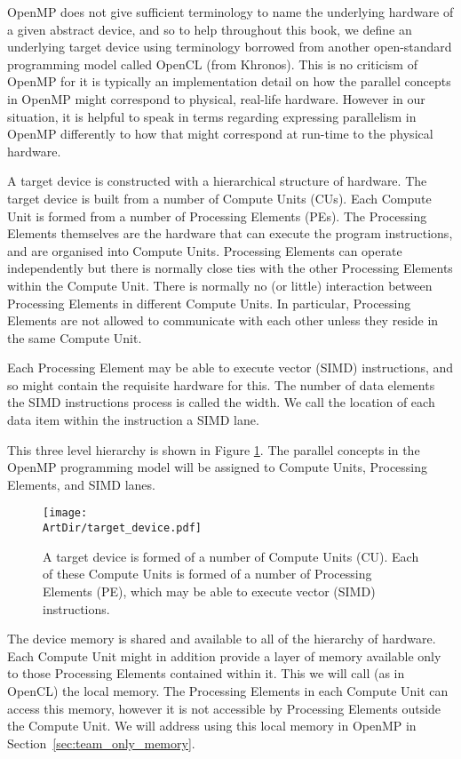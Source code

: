OpenMP does not give sufficient terminology to name the underlying hardware of a given abstract device, and so to help throughout this book, we define an underlying target device using terminology borrowed from another open-standard programming model called OpenCL (from Khronos).
This is no criticism of OpenMP for it is typically an implementation detail on how the parallel concepts in OpenMP might correspond to physical, real-life hardware.
However in our situation, it is helpful to speak in terms regarding expressing parallelism in OpenMP differently to how that might correspond at run-time to the physical hardware.

A target device is constructed with a hierarchical structure of hardware.
The target device is built from a number of Compute Units (CUs).
Each Compute Unit is formed from a number of Processing Elements (PEs).
The Processing Elements themselves are the hardware that can execute the program instructions, and are organised into Compute Units.
Processing Elements can operate independently but there is normally close ties with the other Processing Elements within the Compute Unit.
There is normally no (or little) interaction between Processing Elements in different Compute Units.
In particular, Processing Elements are not allowed to communicate with each other unless they reside in the same Compute Unit.

Each Processing Element may be able to execute vector (SIMD) instructions, and so might contain the requisite hardware for this.
The number of data elements the SIMD instructions process is called the width.
We call the location of each data item within the instruction a SIMD lane.

This three level hierarchy is shown in Figure \ref{figure:target_device_hierarchy}.
The parallel concepts in the OpenMP programming model will be assigned to Compute Units, Processing Elements, and SIMD lanes.

\begin{figure}[t]
\centerline{\texttt{[image: \\ArtDir/target\_device.pdf]}}
\caption{A target device is formed of a number of Compute Units (CU). Each of these Compute Units is formed of a number of Processing Elements (PE), which may be able to execute vector (SIMD) instructions.}
\label{figure:target_device_hierarchy}
\end{figure}

The device memory is shared and available to all of the hierarchy of hardware.
Each Compute Unit might in addition provide a layer of memory available only to those Processing Elements contained within it.
This we will call (as in OpenCL) the local memory.
The Processing Elements in each Compute Unit can access this memory, however it is not accessible by Processing Elements outside the Compute Unit.
We will address using this local memory in OpenMP in Section~\ref{sec:team_only_memory}.

